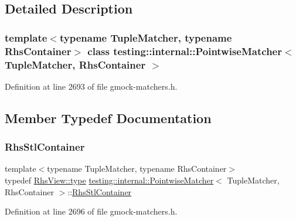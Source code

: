 \subsection{Detailed Description}
\subsubsection*{template$<$typename Tuple\+Matcher, typename Rhs\+Container$>$\newline
class testing\+::internal\+::\+Pointwise\+Matcher$<$ Tuple\+Matcher, Rhs\+Container $>$}



Definition at line 2693 of file gmock-\/matchers.\+h.



\subsection{Member Typedef Documentation}
\mbox{\label{classtesting_1_1internal_1_1PointwiseMatcher_aadbaec8c93351f29b103816c2e397edd}} 
\subsubsection{\texorpdfstring{Rhs\+Stl\+Container}{RhsStlContainer}}
{\footnotesize\ttfamily template$<$typename Tuple\+Matcher, typename Rhs\+Container$>$ \\
typedef \hyperlink{classtesting_1_1internal_1_1StlContainerView_a2b2c63a6dcdbfe63fb0ee121ebf463ba}{Rhs\+View\+::type} \hyperlink{classtesting_1_1internal_1_1PointwiseMatcher}{testing\+::internal\+::\+Pointwise\+Matcher}$<$ Tuple\+Matcher, Rhs\+Container $>$\+::\hyperlink{classtesting_1_1internal_1_1PointwiseMatcher_aadbaec8c93351f29b103816c2e397edd}{Rhs\+Stl\+Container}}



Definition at line 2696 of file gmock-\/matchers.\+h.

\mbox{\label{classtesting_1_1internal_1_1PointwiseMatcher_a9f7f1abbfa795033e1e1c1df385b4617}} 
